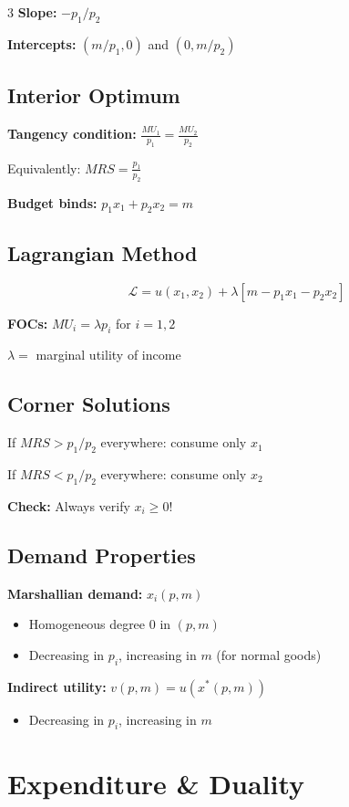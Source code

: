 \documentclass[10pt,landscape]{article}
\begin{document}
\begin{multicols}{3}
\textbf{Slope:} $-p_1/p_2$

\textbf{Intercepts:} $(m/p_1, 0)$ and $(0, m/p_2)$

\subsection{Interior Optimum}
\textbf{Tangency condition:} $\frac{MU_1}{p_1} = \frac{MU_2}{p_2}$

Equivalently: $MRS = \frac{p_1}{p_2}$

\textbf{Budget binds:} $p_1 x_1 + p_2 x_2 = m$

\subsection{Lagrangian Method}
$$\mathcal{L} = u(x_1, x_2) + \lambda[m - p_1 x_1 - p_2 x_2]$$

\textbf{FOCs:} $MU_i = \lambda p_i$ for $i = 1, 2$

$\lambda = $ marginal utility of income

\subsection{Corner Solutions}
If $MRS > p_1/p_2$ everywhere: consume only $x_1$

If $MRS < p_1/p_2$ everywhere: consume only $x_2$

\textbf{Check:} Always verify $x_i \geq 0$!

\subsection{Demand Properties}
\textbf{Marshallian demand:} $x_i(p, m)$
\begin{itemize}[leftmargin=*,noitemsep]
\item Homogeneous degree 0 in $(p, m)$
\item Decreasing in $p_i$, increasing in $m$ (for normal goods)
\end{itemize}

\textbf{Indirect utility:} $v(p, m) = u(x^*(p, m))$
\begin{itemize}[leftmargin=*,noitemsep]
\item Decreasing in $p_i$, increasing in $m$
\end{itemize}

\section{Expenditure \& Duality}


\end{multicols}
\end{document}
